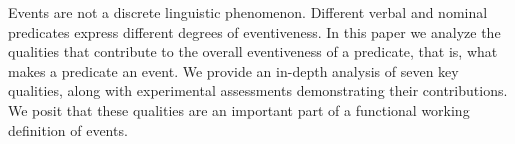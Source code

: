 Events are not a discrete linguistic phenomenon. Different verbal and nominal predicates express different degrees of eventiveness. In this paper we analyze the qualities that contribute to the overall eventiveness of a predicate, that is, what makes a predicate an event. We provide an in-depth analysis of seven key qualities, along with experimental assessments demonstrating their contributions. We posit that these qualities are an important part of a functional working definition of events.
